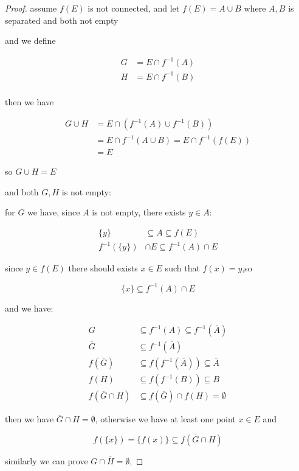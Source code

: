 \begin{proof}
    assume $f(E)$ is not connected, and let $f(E) = A \cup B$ where $A, B$ is separated and both not empty

    and we define

    \begin{align*}
        G &= E \cap f^{-1}(A) \\
        H &= E \cap f^{-1}(B) \\
    \end{align*}

    then we have

    \begin{align*}
        G \cup H &= E \cap (f^{-1}(A) \cup f^{-1}(B))  \\
        &= E \cap f^{-1}(A \cup B) = E \cap f^{-1}(f(E)) \\
        & = E
    \end{align*}

    so $G \cup H = E$

    and both $G, H$ is not empty:

    for $G$ we have, since $A$ is not empty, there exists $y \in A$:

    \begin{align*}
        \{y \} & \subseteq A \subseteq f(E) \\
        f^{-1}(\{ y \}) & \cap E \subseteq f^{-1}(A) \cap E
    \end{align*}

    since $y \in f(E)$ there should exists $x \in E$ such that $f(x) = y$,so

    \[
        \{ x \} \subseteq f^{-1}(A) \cap E
    \]


    and we have:

    \begin{align*}
        G &\subseteq f^{-1}(A) \subseteq f^{-1}(\overline{A}) \\
        \overline{G} & \subseteq f^{-1}(\overline{A}) \\
        f(\overline{G}) & \subseteq f(f^{-1}(\overline{A})) \subseteq \overline{A} \\
        f(H) & \subseteq f(f^{-1}(B)) \subseteq B \\
        f(\overline{G} \cap H) & \subseteq f(\overline{G}) \cap f(H) = \emptyset
    \end{align*}

    then we have $\overline{G} \cap H = \emptyset$, otherwise we have at least one point $x \in E$ and

    \[
        f(\{ x \}) = \{ f(x)\} \subseteq f(\overline{G} \cap H)
    \]

    similarly we can prove $G \cap \overline{H} = \emptyset$, 
\end{proof}